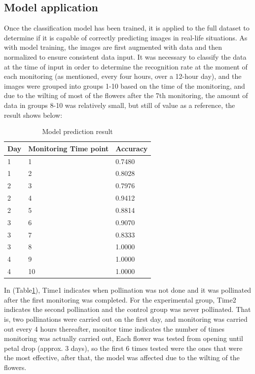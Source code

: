 \documentclass[11pt,a4paper]{article}
\begin{document}
\begin{spacing}{1.5}
\subsection{Model application}
Once the classification model has been trained, it is applied to the full dataset to determine if it is capable of correctly predicting images in real-life situations. As with model training, the images are first augmented with data and then normalized to ensure consistent data input. It was necessary to classify the data at the time of input in order to determine the recognition rate at the moment of each monitoring (as mentioned, every four hours, over a 12-hour day), and the images were grouped into groups 1-10 based on the time of the monitoring, and due to the wilting of most of the flowers after the 7th monitoring, the amount of data in groups 8-10 was relatively small, but still of value as a reference, the result shows below:

\begin{table}[H]
\centering
\caption{Model prediction result}
\begin{tabular}{|l|l|l|}
\hline
Day & Monitoring Time point & Accuracy\\
\hline
1 & 1 & 0.7480\\
1 & 2 & 0.8028\\
2 & 3 & 0.7976\\
2 & 4 & 0.9412\\
2 & 5 & 0.8814\\
3 & 6 & 0.9070\\
3 & 7 & 0.8333\\
3 & 8 & 1.0000\\
4 & 9 & 1.0000\\
4 & 10 & 1.0000\\
\hline
\end{tabular}
\label{tab:prediction}
\end{table}

In (Table\ref{tab:prediction}), Time1 indicates when pollination was not done and it was pollinated after the first monitoring was completed. For the experimental group, Time2 indicates the second pollination and the control group was never pollinated. That is, two pollinations were carried out on the first day, and monitoring was carried out every 4 hours thereafter, monitor time indicates the number of times monitoring was actually carried out, Each flower was tested from opening until petal drop (approx. 3 days), so the first 6 times tested were the ones that were the most effective, after that, the model was affected due to the wilting of the flowers.


\end{spacing}
\end{document}
